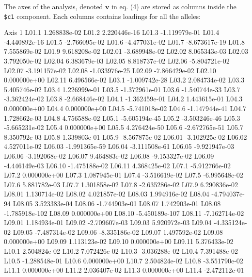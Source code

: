 \documentclass{article}
\newcommand{\m}[1]{\mathbf{#1}}
\begin{document}
\noindent The axes of the analysis, denoted $\m{v}$ in eq. (4) \cite{tjart04}
are stored as columns inside the \texttt{\$c1} component.
Each columns contains loadings for all the alleles:
\begin{Schunk}
\begin{Soutput}
               Axis 1
L01.1    1.268838e-02
L01.2    2.220446e-16
L01.3   -1.119979e-01
L01.4   -4.440892e-16
L01.5   -2.766095e-02
L01.6   -4.477031e-02
L01.7   -8.673617e-19
L01.8    7.555869e-02
L01.9    9.618208e-02
L02.01  -3.689948e-02
L02.02   8.065343e-03
L02.03   3.792050e-02
L02.04   6.383679e-03
L02.05   8.818737e-02
L02.06  -5.804721e-02
L02.07  -3.191157e-02
L02.08  -1.033976e-25
L02.09  -7.866429e-02
L02.10   0.000000e+00
L02.11   6.496566e-02
L03.1   -1.009742e-28
L03.2    2.084734e-02
L03.3    5.405746e-02
L03.4    1.226999e-01
L03.5   -1.372961e-01
L03.6   -1.540744e-33
L03.7   -3.362424e-02
L03.8   -2.668446e-02
L04.1   -1.362459e-01
L04.2    1.443615e-01
L04.3    0.000000e+00
L04.4    0.000000e+00
L04.5   -5.741018e-02
L04.6   -1.147944e-41
L04.7    1.728662e-03
L04.8    4.756588e-02
L05.1   -5.605194e-45
L05.2   -3.503246e-46
L05.3   -5.665231e-02
L05.4    0.000000e+00
L05.5    4.276424e-50
L05.6   -2.672765e-51
L05.7    8.350792e-03
L05.8    1.339803e-01
L05.9   -8.567875e-02
L06.01  -3.102925e-02
L06.02   4.527011e-02
L06.03  -1.991365e-59
L06.04  -3.111508e-61
L06.05  -9.921947e-03
L06.06  -3.192068e-02
L06.07   9.464883e-02
L06.08  -9.153327e-02
L06.09  -4.446149e-03
L06.10  -1.475188e-02
L06.11   4.368425e-02
L07.1   -5.912766e-02
L07.2    0.000000e+00
L07.3    1.087945e-01
L07.4   -3.516619e-02
L07.5   -6.995648e-02
L07.6    5.881782e-03
L07.7    1.301858e-02
L07.8   -2.635286e-02
L07.9    6.290836e-02
L08.01   1.130714e-02
L08.02   4.021857e-02
L08.03   1.994916e-02
L08.04  -4.794037e-94
L08.05   3.523383e-04
L08.06  -1.744903e-01
L08.07   1.742903e-01
L08.08 -1.785918e-102
L08.09   0.000000e+00
L08.10 -5.450189e-107
L08.11  -7.162714e-02
L09.01   1.184934e-01
L09.02  -2.709607e-03
L09.03   5.920972e-03
L09.04  -4.335124e-02
L09.05  -7.487314e-02
L09.06  -8.335186e-02
L09.07   1.497592e-02
L09.08   0.000000e+00
L09.09   1.113123e-02
L09.10   0.000000e+00
L09.11   5.376433e-02
L10.1    2.504824e-02
L10.2    7.072426e-02
L10.3   -3.036288e-02
L10.4    7.391488e-02
L10.5   -1.288548e-01
L10.6    0.000000e+00
L10.7    2.504824e-02
L10.8   -3.551790e-02
L11.1    0.000000e+00
L11.2    2.036407e-02
L11.3    0.000000e+00
L11.4   -2.472112e-01

\end{Soutput}
\end{Schunk}
\end{document}
